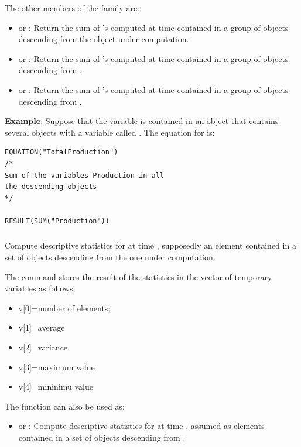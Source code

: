 \documentclass [11pt,a4paper] {book}
\begin{document}
The other members of the family are:

\begin{itemize}
  \item {} or : Return the sum of 's computed at time  contained in a group of objects descending from the object under computation.
  \item {} or : Return the sum of 's computed at time  contained in a group of objects descending from .
  \item {} or : Return the sum of 's computed at time  contained in a group of objects descending from .
\end{itemize}

\textbf{Example}: Suppose that the variable  is contained in an object
 that contains several objects  with a variable called
. The equation for  is:



\small
\begin{verbatim}
EQUATION("TotalProduction")
/*
Sum of the variables Production in all 
the descending objects
*/

RESULT(SUM("Production"))
\end{verbatim}
\normalsize


\subsubsection{ } \label{fun:stat}
Compute descriptive statistics for  at time , supposedly an element contained in a set of objects descending from the one under computation.

The command stores the result of the statistics in the vector of temporary variables
 as follows:
\begin{itemize}
  \item v[0]=number of elements;
  \item v[1]=average
  \item v[2]=variance
  \item v[3]=maximum value
  \item v[4]=mininimu value
\end{itemize}

The function can also be used as:
\begin{itemize}
  \item {} or : Compute descriptive statistics for  at time , assumed as elements contained in a set of objects descending from .
\end{itemize}
\end{document}
